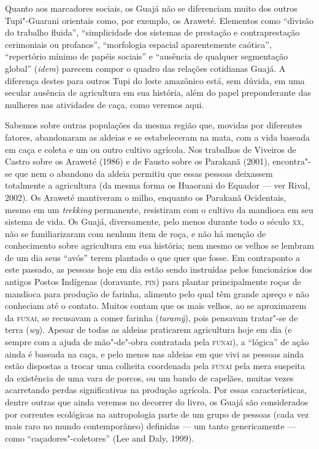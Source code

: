 Quanto aos marcadores sociais, os Guajá não se diferenciam muito dos
outros Tupi"-Guarani orientais como, por exemplo, os Araweté. Elementos
como ``divisão do trabalho fluida'', ``simplicidade dos sistemas de
prestação e contraprestação cerimoniais ou profanos'', ``morfologia
espacial aparentemente caótica'', ``repertório mínimo de papéis
sociais'' e ``ausência de qualquer segmentação global'' (\emph{idem}) parecem
compor o quadro das relações cotidianas Guajá. A diferença destes para
outros Tupi do leste amazônico está, sem dúvida, em uma secular ausência
de agricultura em sua história, além do papel preponderante das mulheres
nas atividades de caça, como veremos aqui.

Sabemos sobre outras populações da mesma região que, movidas por
diferentes fatores, abandonaram as aldeias e se estabeleceram na mata,
com a vida baseada em caça e coleta e um ou outro cultivo agrícola. Nos
trabalhos de Viveiros de Castro sobre os Araweté (1986) e de Fausto
sobre os Parakanã (2001), encontra"-se que nem o abandono da aldeia
permitiu que essas pessoas deixassem totalmente a agricultura (da mesma
forma os Huaorani do Equador --- ver Rival, 2002). Os Araweté mantiveram o
milho, enquanto os Parakanã Ocidentais, mesmo em um \emph{trekking}
permanente, resistiram com o cultivo da mandioca em seu sistema de vida.
Os Guajá, diversamente, pelo menos durante todo o século \textsc{xx}, não se
familiarizaram com nenhum item de roça, e não há menção de conhecimento
sobre agricultura em sua história; nem mesmo os velhos se lembram de um
dia seus ``avós'' terem plantado o que quer que fosse. Em contraponto a
este passado, as pessoas hoje em dia estão sendo instruídas pelos
funcionários dos antigos Postos Indígenas (doravante, \textsc{pin}) para plantar
principalmente roças de mandioca para produção de farinha, alimento pelo
qual têm grande apreço e não conheciam até o contato. Muitos contam que
os mais velhos, ao se aproximarem da \textsc{funai}, se recusavam a comer farinha
(\emph{taramỹ}), pois pensavam tratar"-se de terra (\emph{wy}). Apesar de
todas as aldeias praticarem agricultura hoje em dia (e sempre com a
ajuda de mão"-de"-obra contratada pela \textsc{funai}), a ``lógica'' de ação ainda é
baseada na caça, e pelo menos nas aldeias em que vivi as pessoas ainda
estão dispostas a trocar uma colheita coordenada pela \textsc{funai} pela mera
suspeita da existência de uma vara de porcos, ou um bando de capelães,
muitas vezes acarretando perdas significativas na produção agrícola. Por
essas características, dentre outras que ainda veremos no decorrer do
livro, os Guajá são considerados por correntes ecológicas na
antropologia parte de um grupo de pessoas (cada vez mais raro no mundo
contemporâneo) definidas --- um tanto genericamente --- como
``caçadores"-coletores'' (Lee and Daly, 1999).

